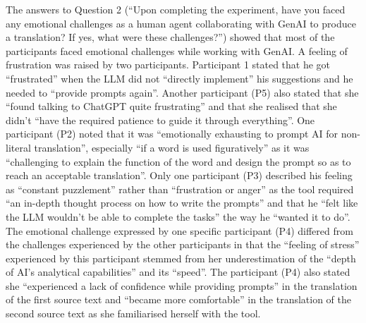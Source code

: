 \documentclass[output=paper,colorlinks,citecolor=brown]{langscibook}
\begin{document}
The answers to Question 2 (“Upon completing the experiment, have you faced any emotional challenges as a human agent collaborating with GenAI to produce a translation? If yes, what were these challenges?”) showed that most of the participants faced emotional challenges while working with GenAI. A feeling of frustration was raised by two participants. Participant 1 stated that he got “frustrated” when the LLM did not “directly implement” his suggestions and he needed to “provide prompts again”. Another participant (P5) also stated that she “found talking to ChatGPT quite frustrating” and that she realised that she didn't “have the required patience to guide it through everything”. One participant (P2) noted that it was “emotionally exhausting to prompt AI for non-literal translation”, especially “if a word is used figuratively” as it was “challenging to explain the function of the word and design the prompt so as to reach an acceptable translation”. Only one participant (P3) described his feeling as “constant puzzlement” rather than “frustration or anger” as the tool required “an in-depth thought process on how to write the prompts” and that he “felt like the LLM wouldn’t be able to complete the tasks” the way he “wanted it to do”. The emotional challenge expressed by one specific participant (P4) differed from the challenges experienced by the other participants in that the “feeling of stress” experienced by this participant stemmed from her underestimation of the “depth of AI’s analytical capabilities” and its “speed”. The participant (P4) also stated she “experienced a lack of confidence while providing prompts” in the translation of the first source text and “became more comfortable” in the translation of the second source text as she familiarised herself with the tool.
\end{document}
